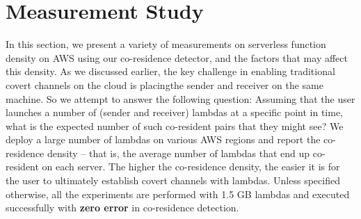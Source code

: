 \section{Measurement Study}
\label{sec:study}


In this section, we present a variety of measurements on serverless function
density on AWS using our co-residence detector, and the factors that may affect
this density. As we discussed earlier, the key challenge in enabling traditional
covert channels on the cloud is placingthe sender and receiver on the same
machine. So we attempt to answer the following question: Assuming that the user
launches a number of (sender and receiver) lambdas at a specific point in time,
what is the expected number of such co-resident pairs that they might see? We
deploy a large number of lambdas on various AWS regions and report the
co-residence density -- that is, the average number of lambdas that end up
co-resident on each server.  The higher the co-residence density, the easier it
is for the user to ultimately establish covert channels with lambdas. Unless
specified otherwise, all the experiments are performed with 1.5 GB lambdas and
executed successfully with \textbf{zero error} in co-residence detection.


